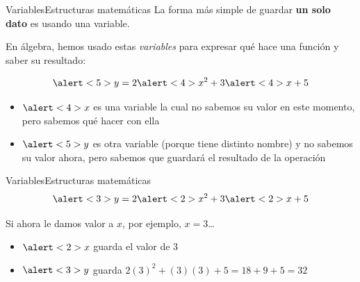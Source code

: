 \documentclass[spanish, c]{beamer}
\begin{document}
\begin{frame}{Variables}{Estructuras matemáticas}
    La forma más simple de guardar \textbf{un solo dato} es usando una \alert{variable}. \pause

    En álgebra, hemos usado estas \textit{variables} para expresar qué hace una función y saber su resultado: \pause

    $$\alert<5>{y} = 2\alert<4>{x}^2 + 3\alert<4>{x} + 5$$ \pause

    \begin{itemize}
        \item $\alert<4>{x}$ es una variable la cual no sabemos su valor en este momento, pero sabemos qué hacer con ella
        \item $\alert<5>{y}$ es otra variable (porque tiene distinto nombre) y no sabemos su valor ahora, pero sabemos que guardará el resultado de la operación
    \end{itemize}

\end{frame}

\begin{frame}[t]{Variables}{Estructuras matemáticas}    
    $$\alert<3>{y} = 2\alert<2>{x}^2 + 3\alert<2>{x} + 5$$

    \bigskip

    Si ahora le damos valor a $x$, por ejemplo, $x = 3$\dots \pause

    \bigskip

    \begin{itemize}
        \itemsep1.7ex
        \item $\alert<2>{x}$ guarda el valor de $3$
        \item $\alert<3>{y}$ guarda $2 (3)^2 + (3)(3) + 5 = 18 + 9 + 5 = 32$
    \end{itemize}

\end{frame}
\end{document}
